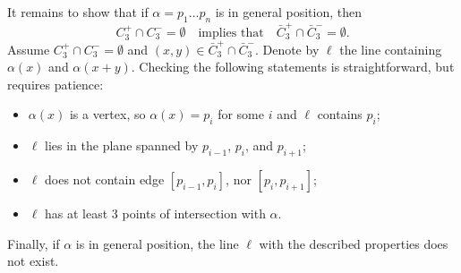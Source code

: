 It remains to show that if $\alpha=p_1\dots p_n$ is in general position, then
\[C_3^+\cap C_3^-=\emptyset\quad\text{implies that}\quad
\bar C_3^+\cap \bar C_3^-=\emptyset.\]
Assume $C_3^+\cap C_3^-=\emptyset$ and $(x,y)\in \bar C_3^+\cap \bar C_3^-$.
Denote by $\ell$ the line containing $\alpha(x)$ and $\alpha(x+y)$.
Checking the following statements is straightforward, but requires patience:
\begin{itemize}
 \item $\alpha(x)$ is a vertex, so $\alpha(x)=p_i$ for some $i$ and $\ell$ contains $p_i$;
 \item $\ell$ lies in the plane spanned by $p_{i-1}$, $p_i$, and $p_{i+1}$; 
 \item $\ell$ does not contain edge $[p_{i-1}, p_i]$, nor $[p_{i}, p_{i+1}]$;
 \item $\ell$ has at least 3 points of intersection with $\alpha$.
\end{itemize}
Finally, if $\alpha$ is in general position,
the line $\ell$ with the described properties does not exist.
\qeds





